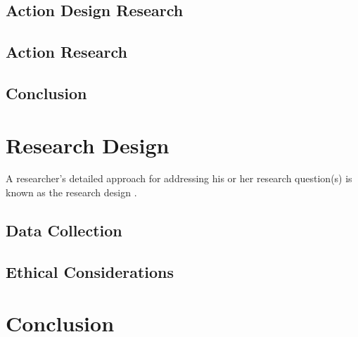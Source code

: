 \subsection{Action Design Research}
\subsection{Action Research}
\subsection{Conclusion}


\section{Research Design}
A researcher's detailed approach for addressing his or her research question(s) is known as the research design \citep{mardiana2020modifying}.
\subsection{Data Collection}
\subsection{Ethical Considerations}


\section{Conclusion}
